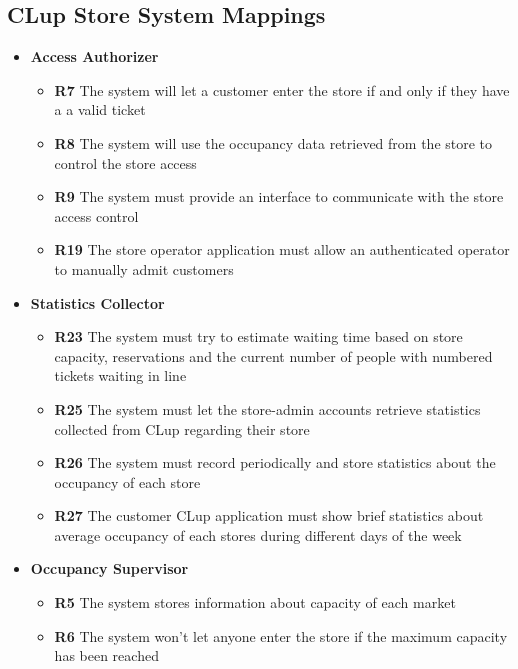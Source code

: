 \clearpage
\subsection{CLup Store System Mappings}
\begin{itemize}
    \item \colorbox{clup_yellow}{\textbf{Access Authorizer}}
          \begin{itemize}
              \item \textbf{R7} The system will let a customer enter the store if and only if they have a a valid ticket
              \item \textbf{R8} The system will use the occupancy data retrieved from the store to control the store access
              \item \textbf{R9} The system must provide an interface to communicate with the store access control
              \item \textbf{R19} The store operator application must allow an authenticated operator to manually admit customers
          \end{itemize}
    \item \colorbox{clup_yellow}{\textbf{Statistics Collector}}
          \begin{itemize}
              \item \textbf{R23} The system must try to estimate waiting time based on store capacity, reservations and the current number of people with numbered tickets waiting in line
              \item \textbf{R25} The system must let the store-admin accounts retrieve statistics collected from CLup regarding their store
              \item \textbf{R26} The system must record periodically and store statistics about the occupancy of each store
              \item \textbf{R27} The customer CLup application must show brief statistics about average occupancy of each stores during different days of the week
          \end{itemize}
    \item \colorbox{clup_yellow}{\textbf{Occupancy Supervisor}}
          \begin{itemize}
              \item \textbf{R5} The system stores information about capacity of each market
              \item \textbf{R6} The system won’t let anyone enter the store if the maximum capacity has been reached

\end{itemize}
\end{itemize}
